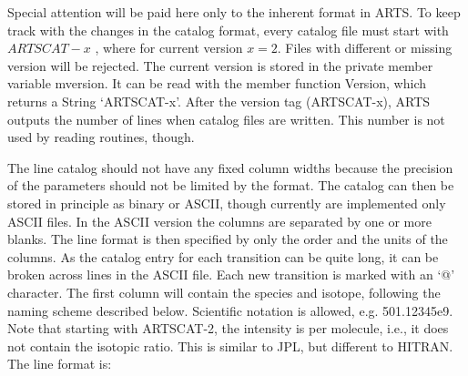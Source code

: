 Special attention will be paid here only to the inherent format in ARTS.
To keep track with the changes in the catalog format, every catalog file
must start with $ARTSCAT-x$ , where for current version $x=2$.  Files
with different or missing version will be rejected. The current
version is stored in the private member variable mversion. It can be
read with the member function Version, which returns a String `ARTSCAT-x'.
After the version tag (ARTSCAT-x), ARTS outputs the number of lines
when catalog files are written. This number is not used by reading
routines, though.

The line catalog should not have any fixed column widths because the
precision of the parameters should not be limited by the format. The
catalog can then be stored in principle as binary or ASCII, though
currently are implemented only ASCII files. In the ASCII version
the columns are separated by one or more blanks. The line format is
then specified by only the order and the units of the columns. As the
catalog entry for each transition can be quite long, it can be broken
across lines in the ASCII file. Each new transition is marked with an
`@' character.  The first column will contain the species and isotope,
following the naming scheme described below. Scientific notation is
allowed, e.g. 501.12345e9.  Note that starting with ARTSCAT-2, the
intensity is per molecule, i.e., it does not contain the isotopic
ratio. This is similar to JPL, but different to HITRAN.  The line
format is:

